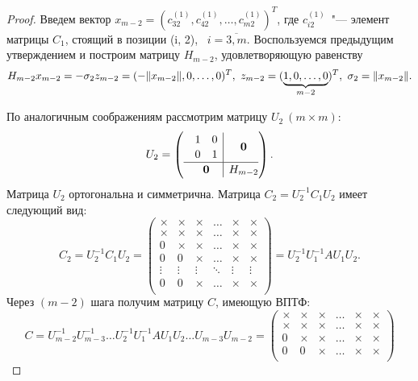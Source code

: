 \documentclass[11pt,a4paper,twoside]{report}
\numberwithin{equation}{section}
\theoremstyle{definition}
\theoremstyle{plain}
\DeclarePairedDelimiter\norm{\lVert}{\rVert}
\begin{document}
\begin{proof}
Введем вектор $x_{m-2}=(c_{32}^{(1)}, c_{42}^{(1)},\ldots,c_{m2}^{(1)})^T$,
где $c_{i2}^{(1)}$~"--- элемент матрицы $C_1$, стоящий в позиции (i, 2),
~$i = \overline{3, m}$.
Воспользуемся предыдущим утверждением и построим матрицу $H_{m-2}$,
удовлетворяющую равенству
%
$$
    H_{m-2}x_{m-2}=-\sigma_2z_{m-2}=(-\norm{x_{m-2}},0,\ldots,0)^T,
    ~z_{m-2}=(\underbrace{1,0,\ldots,0}_{m-2})^T, ~\sigma_2 = \norm{x_{m-2}}.
$$
%

По аналогичным соображениям рассмотрим матрицу $U_2~(m \times m)$:
%
$$
\renewcommand\arraystretch{1.1}
    U_2=\left(
    \begin{array}{c@{}|c@{}}
        \begin{array}{cc}
            1 & 0 \\
            0 & 1 \\
        \end{array}
        & \mathbf{0} \\ \hline
        \mathbf{0} & H_{m-2}\\
    \end{array}
    \right).
$$
%
Матрица $U_2$ ортогональна и симметрична. Матрица $C_2=U_2^{-1}C_1U_2$
имеет следующий вид:
%
$$
    C_2=U_2^{-1}C_1U_2=
    \begin{pmatrix}
        \times & \times & \times  & \ldots & \times & \times\\
        \times & \times & \times  & \ldots & \times & \times\\
        0      & \times & \times  & \ldots & \times & \times\\
        0      & 0      & \times  & \ldots & \times & \times\\
        \vdots & \vdots & \vdots  & \ddots & \vdots & \vdots\\
        0      & 0      & \times  & \ldots & \times & \times\\
    \end{pmatrix}
    =U_2^{-1}U^{-1}_1AU_1U_2.
$$
%
Через $(m-2)$ шага получим матрицу $C$, имеющую {\scshape ВПТФ}:
%
$$
    C=U^{-1}_{m-2}U^{-1}_{m-3}\ldots
    U^{-1}_2U^{-1}_1AU_1U_2\ldots U_{m-3} U_{m-2}=
    \begin{pmatrix}
        \times & \times & \times & \ldots & \times & \times\\
        \times & \times & \times & \ldots & \times & \times\\
        0      & \times & \times & \ldots & \times & \times\\
        0      &      0 & \times & \ldots & \times & \times\\

\end{pmatrix}$$
\end{proof}
\end{document}
